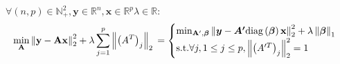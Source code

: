 \begin{proposition}
\label{gps_equivalence}
  $\forall (n, p) \in \mathbb{N}_+^2, \bm{y} \in \mathbb{R}^{n}, \bm{x} \in \mathbb{R}^{p} \lambda \in \mathbb{R}$:
\vspace{-.05in}
  \begin{equation*}
    \min_{\bf{A}} \left\lVert\bf{y} - \bf{A}\bf{x}\right\rVert_2^2 + \lambda \sum_{j=1}^p \left\lVert\left(A^T\right)_j\right\rVert_2 \\
     = \begin{cases}
         \min_{\bf{A'}, \bm{\beta}} \left\lVert\bm{y} - \bm{A'}\text{diag}\left(\bm{\beta}\right)\bf{x}\right\rVert_2^2 + \lambda \left\lVert\bm{\beta}\right\rVert_1 \\
          \text{s.t.} \forall j, 1 \leq j \leq p, \left\lVert\left(A'^T\right)_j\right\rVert_2^2 = 1
        \end{cases}
  \end{equation*}
\end{proposition}
\vspace{-.2in}
